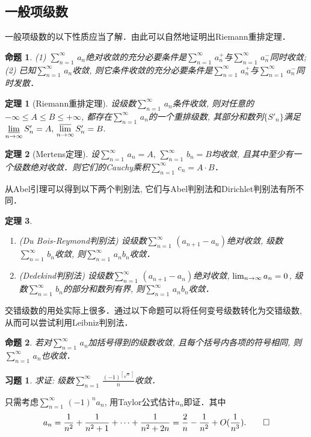 \documentclass[11pt,a4paper]{ctexart}
\makeatletter
\theoremstyle{thmseries} %
\newtheorem{thm}{定理}[section]
\newtheorem{prop}{命题}[section]
\theoremstyle{exerseries}
\newtheorem{exer}{习题}[section]
\renewenvironment{proof}[1][\proofname]{\par
  \pushQED{\qed}%
  \normalfont \topsep6\p@\@plus6\p@\relax
  \trivlist
  \item[\hskip\labelsep
        \itshape
    #1\@addpunct{}]\ignorespaces
}{%
  \popQED\endtrivlist\@endpefalse
}
\newenvironment{pf}{\begin{proof}[\bfseries\upshape 证\quad]}{\end{proof}}
\def \nti {\mathnormal{n}\to\infty}
\def \tseries {{\textstyle\sum\limits_{n=1}^{\infty}}\,} %
\def \vs {\vspace{-1em}}
\DeclareMathOperator{\llim}{\underset{\nti}{\underline{\lim}}}
\DeclareMathOperator{\ulim}{\underset{\nti}{\overline{\lim}}}
\makeatother
\begin{document}
\subsection{一般项级数}
一般项级数的以下性质应当了解．由此可以自然地证明出Riemann重排定理．
\begin{prop}
	\textnormal{(1)} $\tseries a_n$绝对收敛的充分必要条件是$\tseries a_n^+$与$\tseries a_n^-$同时收敛;
	\textnormal{(2)} 已知$\tseries a_n$收敛, 则它条件收敛的充分必要条件是$\tseries a_n^+$与$\tseries a_n^-$同时发散．
\end{prop}

\begin{thm}[Riemann重排定理]
	设级数$\tseries a_n$条件收敛, 则对任意的$-\infty\leq A\leq B\leq +\infty$, 都存在$\tseries a_n$的一个重排级数, 其部分和数列$\{S'_n\}$满足$\llim S'_n=A,\,\ulim S'_n=B.$
\end{thm}

\begin{thm}[Mertens定理]
	设$\tseries a_n=A,\,\tseries b_n=B$均收敛, 且其中至少有一个级数绝对收敛．则它们的Cauchy乘积$\tseries c_n=A\cdot B$．
\end{thm}

从Abel引理可以得到以下两个判别法, 它们与Abel判别法和Dirichlet判别法有所不同．
\begin{thm}
	\phantom{text}
	\begin{enumerate}
		\item (Du Bois-Reymond判别法) 设级数$\tseries(a_{n+1}-a_n)$绝对收敛, 级数$\tseries b_n$收敛, 则$\tseries a_nb_n$收敛．
		\item (Dedekind判别法) 设级数$\tseries(a_{n+1}-a_n)$绝对收敛, $\lim_{\nti}a_n=0$, 级数$\tseries b_n$的部分和数列有界, 则$\tseries a_nb_n$收敛．
	\end{enumerate}
\end{thm}

交错级数的用处实际上很多．通过以下命题可以将任何变号级数转化为交错级数, 从而可以尝试利用Leibniz判别法．
\begin{prop}
	若对$\tseries a_n$加括号得到的级数收敛, 且每个括号内各项的符号相同, 则$\tseries a_n$也收敛．
\end{prop}

\begin{exer}
	求证: 级数$\tseries\frac{(-1)^{[\sqrt{n}\,]}}{n}$收敛．
\end{exer}
\begin{pf}
	只需考虑$\tseries(-1)^na_n$, 用Taylor公式估计$a_n$即证．其中\vs
	\[a_n=\frac{1}{n^2}+\frac{1}{n^2+1}+\cdots+\frac{1}{n^2+2n}=\frac{2}{n}-\frac{1}{n^2}+O(\frac{1}{n^3}).\qedhere\]
\end{pf}
\end{document}

